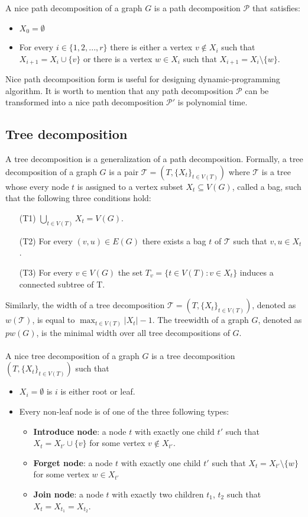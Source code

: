 \documentclass[en]{pracamgr}
\begin{document}
\noindent
A nice path decomposition of a graph $G$ is a path decomposition $\mathcal{P}$ that satisfies:
\begin{itemize}
	\item $X_0 = \emptyset$
	\item For every $i \in \{1,2,...,r\}$ there is either a vertex $v \notin X_i$ such that $X_{i+1} = X_i \cup \{v\}$ or there is a vertex $w \in X_i$ such that $X_{i+1} = X_i \setminus \{w\}$.
\end{itemize}

Nice path decomposition form is useful for designing dynamic-programming algorithm. It is worth to mention that any path decomposition $\mathcal{P}$ can be transformed into a nice path decomposition $\mathcal{P'}$ is polynomial time.

\subsection{Tree decomposition}

A tree decomposition is a generalization of a path decomposition. Formally, a tree decomposition of a graph $G$ is a pair $\mathcal{T} = (T, \{X_t\}_{t\in V(T)})$ where $\mathcal{T}$ is a tree whose every node $t$ is assigned to a vertex subset $X_t \subseteq V(G)$, called a bag, such that the following three conditions hold:
\begin{itemize}
	\item[(T1)] $\bigcup_{t\in V(T)}X_t = V(G)$.
	\item[(T2)] For every $(v,u) \in E(G)$ there exists a bag $t$ of $\mathcal{T}$ such that $v,u \in X_t$.
	\item[(T3)] For every $v \in V(G)$ the set $T_v = \{t \in V(T): v \in X_t\}$ induces a connected subtree of T.
\end{itemize}

Similarly, the width of a tree decomposition $\mathcal{T} = (T,\{X_t\}_{t\in V(T)})$, denoted as $w(\mathcal{T})$, is equal to $\max_{t \in V(T)} |X_t| - 1$. The treewidth of a graph $G$, denoted as $pw(G)$, is the minimal width over all tree decompositions of $G$.
\\
\\
A nice tree decomposition of a graph $G$ is a tree decomposition $(T, \{X_t\}_{t \in V(T)})$ such that
\begin{itemize}
	\item $X_i = \emptyset$ is $i$ is either root or leaf.
	\item Every non-leaf node is of one of the three following types:
	\begin{itemize}
		\item \textbf{Introduce node}: a node $t$ with exactly one child $t'$ such that $X_t = X_{t'} \cup \{v\}$ for some vertex $v \notin X_{t'}$.
		\item \textbf{Forget node}: a node $t$ with exactly one child $t'$ such that $X_t = X_{t'} \setminus \{w\}$ for some vertex $w \in X_{t'}$
		\item \textbf{Join node}: a node $t$ with exactly two children $t_1$, $t_2$ such that $X_t = X_{t_1} = X_{t_2}$.
	\end{itemize}
\end{itemize}
\end{document}
